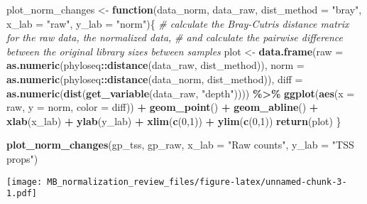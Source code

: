 \documentclass[
]{book}
\newenvironment{Shaded}{\begin{snugshade}}{\end{snugshade}}
\newcommand{\CommentTok}[1]{\textcolor[rgb]{0.56,0.35,0.01}{\textit{#1}}}
\newcommand{\ControlFlowTok}[1]{\textcolor[rgb]{0.13,0.29,0.53}{\textbf{#1}}}
\newcommand{\DataTypeTok}[1]{\textcolor[rgb]{0.13,0.29,0.53}{#1}}
\newcommand{\DecValTok}[1]{\textcolor[rgb]{0.00,0.00,0.81}{#1}}
\newcommand{\KeywordTok}[1]{\textcolor[rgb]{0.13,0.29,0.53}{\textbf{#1}}}
\newcommand{\NormalTok}[1]{#1}
\newcommand{\OperatorTok}[1]{\textcolor[rgb]{0.81,0.36,0.00}{\textbf{#1}}}
\newcommand{\StringTok}[1]{\textcolor[rgb]{0.31,0.60,0.02}{#1}}
\begin{document}
\begin{Shaded}
\begin{Highlighting}[]
\NormalTok{plot\_norm\_changes \textless{}{-}}\StringTok{ }\ControlFlowTok{function}\NormalTok{(data\_norm, data\_raw, }\DataTypeTok{dist\_method =} \StringTok{"bray"}\NormalTok{, }\DataTypeTok{x\_lab =} \StringTok{"raw"}\NormalTok{, }\DataTypeTok{y\_lab =} \StringTok{"norm"}\NormalTok{)\{}
    \CommentTok{\# calculate the Bray{-}Cutris distance matrix for the raw data, the normalized data, }
    \CommentTok{\# and calculate the pairwise difference between the original library sizes between samples}
\NormalTok{    plot \textless{}{-}}\StringTok{ }\KeywordTok{data.frame}\NormalTok{(}\DataTypeTok{raw =} \KeywordTok{as.numeric}\NormalTok{(phyloseq}\OperatorTok{::}\KeywordTok{distance}\NormalTok{(data\_raw, dist\_method)), }
                       \DataTypeTok{norm =} \KeywordTok{as.numeric}\NormalTok{(phyloseq}\OperatorTok{::}\KeywordTok{distance}\NormalTok{(data\_norm, dist\_method)), }
                       \DataTypeTok{diff =} \KeywordTok{as.numeric}\NormalTok{(}\KeywordTok{dist}\NormalTok{(}\KeywordTok{get\_variable}\NormalTok{(data\_raw, }\StringTok{"depth"}\NormalTok{)))) }\OperatorTok{\%\textgreater{}\%}\StringTok{ }
\StringTok{    }\KeywordTok{ggplot}\NormalTok{(}\KeywordTok{aes}\NormalTok{(}\DataTypeTok{x =}\NormalTok{ raw, }\DataTypeTok{y =}\NormalTok{ norm, }\DataTypeTok{color =}\NormalTok{ diff)) }\OperatorTok{+}\StringTok{ }
\StringTok{        }\KeywordTok{geom\_point}\NormalTok{() }\OperatorTok{+}\StringTok{ }
\StringTok{        }\KeywordTok{geom\_abline}\NormalTok{() }\OperatorTok{+}\StringTok{ }
\StringTok{        }\KeywordTok{xlab}\NormalTok{(x\_lab) }\OperatorTok{+}\StringTok{ }\KeywordTok{ylab}\NormalTok{(y\_lab) }\OperatorTok{+}\StringTok{ }\KeywordTok{xlim}\NormalTok{(}\KeywordTok{c}\NormalTok{(}\DecValTok{0}\NormalTok{,}\DecValTok{1}\NormalTok{)) }\OperatorTok{+}\StringTok{ }\KeywordTok{ylim}\NormalTok{(}\KeywordTok{c}\NormalTok{(}\DecValTok{0}\NormalTok{,}\DecValTok{1}\NormalTok{))}
    \KeywordTok{return}\NormalTok{(plot)}
\NormalTok{\}}

\KeywordTok{plot\_norm\_changes}\NormalTok{(gp\_tss, gp\_raw, }\DataTypeTok{x\_lab =} \StringTok{"Raw counts"}\NormalTok{, }\DataTypeTok{y\_lab =} \StringTok{"TSS props"}\NormalTok{)}
\end{Highlighting}
\end{Shaded}

\texttt{[image: MB\_normalization\_review\_files/figure-latex/unnamed-chunk-3-1.pdf]}
\end{document}
